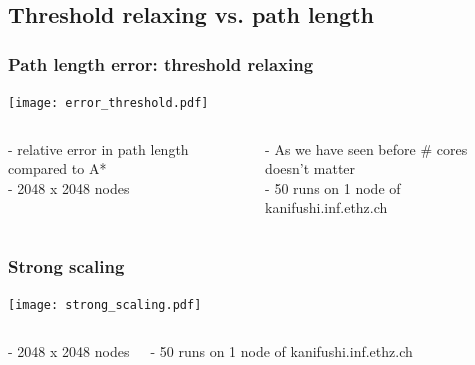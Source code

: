 \documentclass{beamer}
\begin{document}
\subsection{Threshold relaxing vs. path length}

\begin{frame}
\frametitle{Path length error: threshold relaxing}
\begin{center}
	\texttt{[image: error\_threshold.pdf]}
\end{center}

\tiny
\begin{columns}[t] %
- relative error in path length compared to A* \\
- 2048 x 2048 nodes


- As we have seen before \# cores doesn't matter \\
- 50 runs on 1 node of kanifushi.inf.ethz.ch

\end{columns}
\normalsize
\end{frame}

\begin{frame}
\frametitle{Strong scaling}
\begin{center}
	\texttt{[image: strong\_scaling.pdf]}
\end{center}

\tiny
\begin{columns}[t] %
- 2048 x 2048 nodes


- 50 runs on 1 node of kanifushi.inf.ethz.ch
\end{columns}
\normalsize
\end{frame}


%
\end{document}
